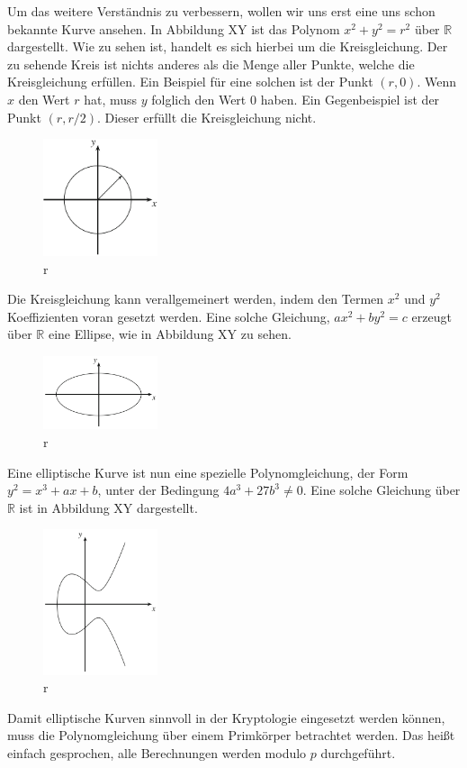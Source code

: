 Um das weitere Verständnis zu verbessern, wollen wir uns erst eine uns schon bekannte Kurve ansehen. In Abbildung XY ist das Polynom $x^2 + y^2 = r^2$ über $\mathbb{R}$ dargestellt. Wie zu sehen ist, handelt es sich hierbei um die Kreisgleichung. Der zu sehende Kreis ist nichts anderes als die Menge aller Punkte, welche die Kreisgleichung erfüllen.
Ein Beispiel für eine solchen ist der Punkt $(r,0)$. Wenn $x$ den Wert $r$ hat, muss $y$ folglich den Wert $0$ haben. Ein Gegenbeispiel ist der Punkt $(r,r/2)$. Dieser erfüllt die Kreisgleichung nicht.
\begin{figure}[!h]
    \centering
    \includegraphics[width=0.3\textwidth]{grafiken/Kreis.PNG}
    \caption[r]{r}
    \label{fig:aufgaben_redesign}
\end{figure}
Die Kreisgleichung kann verallgemeinert werden, indem den Termen $x^2$ und $y^2$ Koeffizienten voran gesetzt werden. Eine solche Gleichung, $ax^2 + by^2 = c$ erzeugt über $\mathbb{R}$ eine Ellipse, wie in Abbildung XY zu sehen.
\begin{figure}[H]
    \centering
    \includegraphics[width=0.3\textwidth]{grafiken/Ellipse.PNG}
    \caption[r]{r}
    \label{fig:aufgaben_redesign}
\end{figure}
Eine elliptische Kurve ist nun eine spezielle Polynomgleichung, der Form $y^2 = x^3 + ax + b$, unter der Bedingung $4a^3 + 27b^3 \neq 0$. Eine solche Gleichung über $\mathbb{R}$ ist in Abbildung XY dargestellt.
\begin{figure}[!h]
    \centering
    \includegraphics[width=0.3\textwidth]{grafiken/Elliptische_Kurve.PNG}
    \caption[r]{r}
    \label{fig:XXXX}
\end{figure}
Damit elliptische Kurven sinnvoll in der Kryptologie eingesetzt werden können, muss die Polynomgleichung über einem Primkörper betrachtet werden. Das heißt einfach gesprochen, alle Berechnungen werden modulo $p$ durchgeführt.
